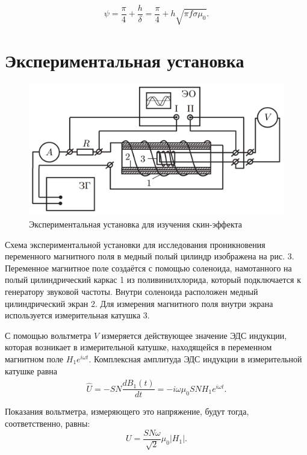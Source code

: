 \documentclass[a4paper, 12pt]{article} %
\begin{document}
	\begin{equation}
		\psi = \frac{\pi}{4} + \frac{h}{\delta} = \frac{\pi}{4} + h\sqrt{\pi f \sigma\mu_0}.
		\label{freq}
	\end{equation}

\section{Экспериментальная установка}
	\begin{figure}[h!]
		\centering
		\includegraphics[scale=0.5]{Scheme.png}
		\caption{Экспериментальная установка для изучения скин-эффекта}
	\end{figure}

	Схема экспериментальной установки для исследования проникновения переменного магнитного поля в медный полый цилиндр изображена на рис. 3. Переменное магнитное поле создаётся с помощью соленоида, намотанного на полый цилиндрический каркас 1 из поливинилхлорида, который подключается к генератору звуковой частоты. Внутри соленоида расположен медный цилиндрический экран 2. Для измерения магнитного поля внутри экрана используется измерительная катушка 3.
	
	С помощью вольтметра $V$ измеряется действующее значение ЭДС индукции, которая возникает в измерительной катушке, находящейся в переменном магнитном поле $H_1 e^{i\omega t}$. Комплексная амплитуда ЭДС индукции в измерительной катушке равна 
	\begin{equation*}
		\widehat{U} = -SN \frac{d\widehat{B_1}(t)}{dt} = -i\omega\mu_0 SN H_1 e^{i\omega t}.
	\end{equation*}
	
	Показания вольтметра, измеряющего это напряжение, будут тогда, соответственно, равны:
	\begin{equation*}
		U = \frac{SN\omega}{\sqrt{2}}\mu_0 |H_1|.
	\end{equation*}
\end{document}
